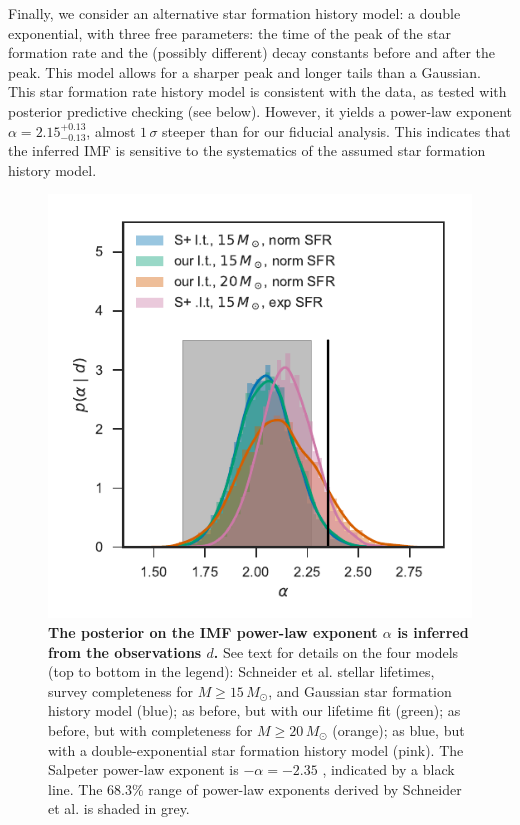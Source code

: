 \documentclass[12pt]{article}
\newcommand{\MSun}{M_\odot}
\newcommand{\onesigrange}[3]{\ensuremath{#1^{+#2}_{-#3}}}
\newcommand{\alpharangefour}{\onesigrange{2.15}{0.13}{0.13}}
\begin{document}
Finally, we consider an alternative star formation history model: a double exponential, with three free parameters: the time of the peak of the star formation rate and the (possibly different) decay constants before and after the peak.  This model allows for a sharper peak and longer tails than a Gaussian.  This star formation rate history model is consistent with the data, as tested with posterior predictive checking (see below).  However, it yields a power-law exponent $\alpha=\alpharangefour$, almost  $1\, \sigma$ steeper than for our fiducial analysis.  This indicates that the inferred IMF is sensitive to the systematics of the assumed star formation history model.

\begin{figure}
\includegraphics[width=\columnwidth]{alpha.pdf}
    		\caption{{\bf The posterior on the IMF power-law exponent $\alpha$ is inferred from the observations $d$.}  See text for details on the four models (top to bottom in the legend): Schneider et al.\cite{Schneider:2018} stellar lifetimes, survey completeness for $M \geq 15 \, \MSun$, and Gaussian star formation history model (blue); as before, but with our lifetime fit (green); as before, but with completeness for $M \geq 20 \, \MSun$ (orange); as blue, but with a double-exponential star formation history model (pink).  The Salpeter power-law exponent is $-\alpha=-2.35$ \cite{Salpeter:1955}, indicated by a black line.  The 68.3\% range of power-law exponents derived by Schneider et al.\cite{Schneider:2018} is shaded in grey. }\label{fig:IMF}
\end{figure}
\end{document}
